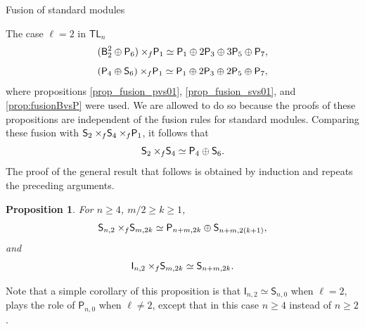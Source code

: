 \documentclass[reqno]{amsart}
\newtheorem{Prop}[Thm]{Proposition}
\newcommand{\tl}[1]{\mathsf{TL}_{#1}}
\newcommand{\ds}[1]{\mathsf S_{#1}}
\newcommand{\dl}[1]{\mathsf I_{#1}}
\newcommand{\dP}[1]{\mathsf P_{#1}}
\newcommand{\xf}{\times\hspace{-0.27em}_f}
\newcommand{\B}[2]{\mathsf{B}^{#1}_{#2}}
\newcommand{\lc}{\ell}
\begin{document}
\begin{section}{Fusion of standard modules}
\begin{subsection}{The case $\lc =2$ in $\tl{n}$}
\begin{equation*}
(\B{2}{2} \oplus \dP{6}) \xf \dP{1} \simeq \dP{1} \oplus 2\dP{3} \oplus 3 \dP{5} \oplus \dP{7},
\end{equation*}
\begin{equation*}
(\dP{4} \oplus \ds{6}) \xf \dP{1} \simeq \dP{1} \oplus 2\dP{3} \oplus 2 \dP{5} \oplus \dP{7},
\end{equation*}
where propositions \ref{prop_fusion_pvs01}, \ref{prop_fusion_svs01}, and \ref{prop:fusionBvsP} were used. We are allowed to do so because the proofs of these propositions are independent of the fusion rules for standard modules. Comparing these fusion with $\ds{2} \xf \ds{4} \xf \dP{1} $, it follows that $$\ds{2} \xf \ds{4} \simeq \dP{4} \oplus \ds{6}.$$ %
The proof of the general result that follows is obtained by induction and repeats the preceding arguments.
\begin{Prop}
For $n \geq 4$, $m/2 \geq k \geq 1$,
$$\ds{n,2} \xf \ds{m,2k} \simeq \dP{n+m,2k} \oplus \ds{n+m, 2(k+1)},$$
and
$$\dl{n,2} \xf \ds{m,2k} \simeq \ds{n+m,2k}.$$
\end{Prop}
Note that a simple corollary of this proposition is that $\dl{n,2}\simeq \ds{n,0}$ when $\lc =2 $, plays the role of $\dP{n,0}$ when $\lc \neq 2$, except that in this case $n\geq 4$ instead of $n\geq 2$.
\end{subsection}


\end{section}
\end{document}
